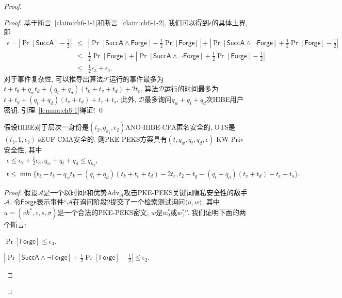 \begin{proof}
\begin{proof}
基于断言~\ref{claim:ch6-1-1}和断言~\ref{claim:ch6-1-2}, 我们可以得到$\epsilon$的具体上界, 即
\[
\begin{array}{lll}
	\epsilon = |\Pr[\mathsf{SuccA}] - \frac{1}{2}| & \leq & |\Pr[\mathsf{SuccA} \wedge \mathsf{Forge}] - \frac{1}{2}\Pr[\mathsf{Forge}]| + 
	       |\Pr[\mathsf{SuccA} \wedge \neg\mathsf{Forge}] + \frac{1}{2}\Pr[\mathsf{Forge}] - \frac{1}{2}|\\ 
	&\leq&  \frac{1}{2}\Pr[\mathsf{Forge}] + |\Pr[\mathsf{SuccA} \wedge \neg\mathsf{Forge}] + \frac{1}{2} \Pr[\mathsf{Forge}] - \frac{1}{2}| \\
& \leq & \frac{1}{2}\epsilon_3 + \epsilon_1. 
\end{array}
\]
对于事件复杂性, 可以推导出算法$\mathcal{F}$运行的事件最多为$t + t_b + q_wt_k + (q_t+q_d)(t_k+t_v+t_d) + 2t_e$, 算法$\mathcal{D}$运行的时间最多为$t + t_g + (q_t+q_d)(t_v+t_d) + t_e + t_s$. 
此外, $\mathcal{D}$最多询问$q_w + q_t + q_d$次HIBE用户密钥. 引理~\ref{lemma:ch6-1}得证! \qed 
\end{proof}


\begin{lemma}\label{lemma:ch6-2}
假设HIBE对于层次一身份是$(t_2, q_{k_2}, \epsilon_2)$ANO-HIBE-CPA匿名安全的, OTS是$(t_3, 1, \epsilon_3)$-sEUF-CMA安全的. 则PKE-PEKS方案具有$(t, q_w, q_t, q_d, \epsilon)$-KW-Priv安全性, 其中
\[ 
\begin{array}{l}
	\epsilon \leq \epsilon_2 + \frac{1}{2}\epsilon_3, q_w +q_t +q_d \leq q_{k_2},\\
	t \leq \min\{t_3 - t_b - q_wt_k - (q_t+q_d)(t_k+t_v+t_d) - 2t_e, t_2 - t_g - (q_t+q_d)(t_v+t_d) - t_e - t_s\}. 
\end{array}
\]
\end{lemma}

\begin{proof}
假设$\mathcal{A}$是一个以时间$t$和优势$\text{Adv}_\mathcal{A}$攻击PKE-PEKS关键词隐私安全性的敌手$\mathcal{A}$. 令$\mathsf{Forge}$表示事件``$\mathcal{A}$在询问阶段2提交了一个检索测试询问$\langle u, w \rangle$, 其中$u = (vk^*, c, s, \sigma)$是一个合法的PKE-PEKS密文, $w$是$w_0^*$或$w_1^*$‘’. 我们证明下面的两个断言: 
\begin{claim}\label{claim:ch6-2-1}
	$\Pr[\mathsf{Forge}] \leq \epsilon_3$. 
\end{claim}

\begin{claim}\label{claim:ch6-2-2}
	$|\Pr[\mathsf{SuccA} \wedge \neg\mathsf{Forge}] + \frac{1}{2} \Pr[\mathsf{Forge}] - \frac{1}{2}| \leq \epsilon_2$.
\end{claim}  


\end{proof}
\end{proof}
